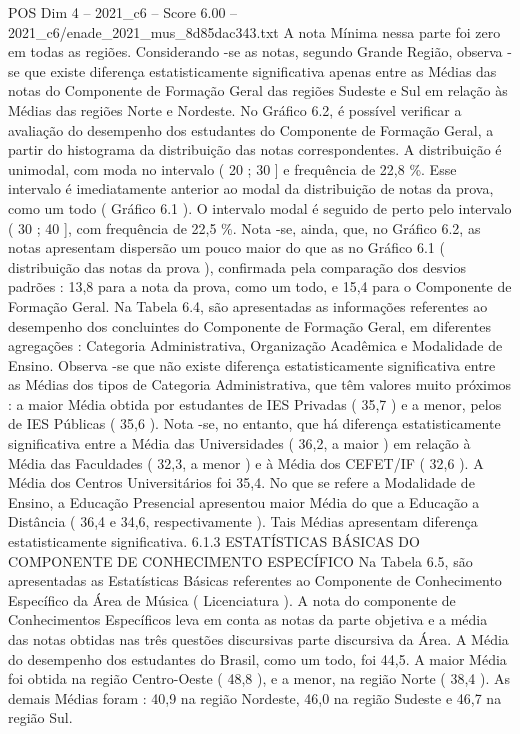 \begin{textsample}{POS Dim 4 – 2021\_c6 – Score 6.00 – 2021\_c6/enade\_2021\_mus\_8d85dac343.txt}
A nota Mínima nessa parte foi zero em todas as regiões.
Considerando -se as notas, segundo Grande Região, observa -se que existe diferença estatisticamente significativa apenas entre as Médias das notas do Componente de Formação Geral das regiões Sudeste e Sul em relação às Médias das regiões Norte e Nordeste.
No Gráfico 6.2, é possível verificar a avaliação do desempenho dos estudantes do Componente de Formação Geral, a partir do histograma da distribuição das notas correspondentes.
A distribuição é unimodal, com moda no intervalo ( 20 ; 30 ] e frequência de 22,8 \%.
Esse intervalo é imediatamente anterior ao modal da distribuição de notas da prova, como um todo ( Gráfico 6.1 ).
O intervalo modal é seguido de perto pelo intervalo ( 30 ; 40 ], com frequência de 22,5 \%.
Nota -se, ainda, que, no Gráfico 6.2, as notas apresentam dispersão um pouco maior do que as no Gráfico 6.1 ( distribuição das notas da prova ), confirmada pela comparação dos desvios padrões : 13,8 para a nota da prova, como um todo, e 15,4 para o Componente de Formação Geral.
Na Tabela 6.4, são apresentadas as informações referentes ao desempenho dos concluintes do Componente de Formação Geral, em diferentes agregações : Categoria Administrativa, Organização Acadêmica e Modalidade de Ensino.
Observa -se que não existe diferença estatisticamente significativa entre as Médias dos tipos de Categoria Administrativa, que têm valores muito próximos : a maior Média obtida por estudantes de IES Privadas ( 35,7 ) e a menor, pelos de IES Públicas ( 35,6 ).
Nota -se, no entanto, que há diferença estatisticamente significativa entre a Média das Universidades ( 36,2, a maior ) em relação à Média das Faculdades ( 32,3, a menor ) e à Média dos CEFET/IF ( 32,6 ).
A Média dos Centros Universitários foi 35,4.
No que se refere a Modalidade de Ensino, a Educação Presencial apresentou maior Média do que a Educação a Distância ( 36,4 e 34,6, respectivamente ).
Tais Médias apresentam diferença estatisticamente significativa. 6.1.3 ESTATÍSTICAS BÁSICAS DO COMPONENTE DE CONHECIMENTO ESPECÍFICO Na Tabela 6.5, são apresentadas as Estatísticas Básicas referentes ao Componente de Conhecimento Específico da Área de Música ( Licenciatura ).
A nota do componente de Conhecimentos Específicos leva em conta as notas da parte objetiva e a média das notas obtidas nas três questões discursivas parte discursiva da Área.
A Média do desempenho dos estudantes do Brasil, como um todo, foi 44,5.
A maior Média foi obtida na região Centro-Oeste ( 48,8 ), e a menor, na região Norte ( 38,4 ).
As demais Médias foram : 40,9 na região Nordeste, 46,0 na região Sudeste e 46,7 na região Sul.

\end{textsample}
